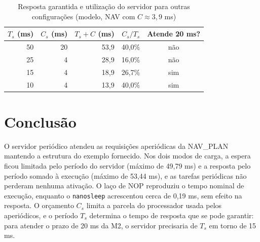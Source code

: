 \documentclass[conference,a4paper]{IEEEtran}
\begin{document}
\begin{table}[!t]
\centering
\caption{Resposta garantida e utilização do servidor para outras configurações (modelo, NAV com $C\approx 3,9$ ms)}
\label{tab:projeto}
\footnotesize
\setlength{\tabcolsep}{4pt}
\begin{tabular}{rrrrc}
\toprule
$T_s$ (ms) & $C_s$ (ms) & $T_s+C$ (ms) & $C_s/T_s$ & Atende 20 ms? \\
\midrule
50 & 20 & 53,9 & 40,0\% & não \\
25 & 4  & 28,9 & 16,0\% & não \\
15 & 4  & 18,9 & 26,7\% & sim \\
10 & 4  & 13,9 & 40,0\% & sim \\
\bottomrule
\end{tabular}
\end{table}

\section{Conclusão}
O servidor periódico atendeu as requisições aperiódicas da NAV\_PLAN mantendo a estrutura do exemplo fornecido. Nos dois modos de carga, a espera ficou limitada pelo período do servidor (máximo de 49,79 ms) e a resposta pelo período somado à execução (máximo de 53,44 ms), e as tarefas periódicas não perderam nenhuma ativação. O laço de NOP reproduziu o tempo nominal de execução, enquanto o \texttt{nanosleep} acrescentou cerca de 0,19 ms, sem efeito na resposta. O orçamento $C_s$ limita a parcela do processador usada pelos aperiódicos, e o período $T_s$ determina o tempo de resposta que se pode garantir: para atender o prazo de 20 ms da M2, o servidor precisaria de $T_s$ em torno de 15 ms.
\end{document}

